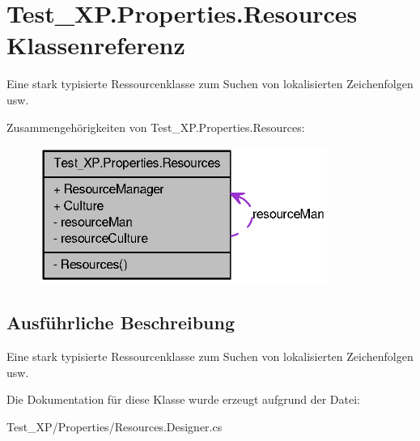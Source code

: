 \hypertarget{class_test___x_p_1_1_properties_1_1_resources}{
\section{Test\_\-XP.Properties.Resources Klassenreferenz}
\label{class_test___x_p_1_1_properties_1_1_resources}
}


Eine stark typisierte Ressourcenklasse zum Suchen von lokalisierten Zeichenfolgen usw.  




Zusammengehörigkeiten von Test\_\-XP.Properties.Resources:\nopagebreak
\begin{figure}[H]
\begin{center}
\leavevmode
\includegraphics[width=267pt]{class_test___x_p_1_1_properties_1_1_resources__coll__graph}
\end{center}
\end{figure}


\subsection{Ausführliche Beschreibung}
Eine stark typisierte Ressourcenklasse zum Suchen von lokalisierten Zeichenfolgen usw. 

Die Dokumentation für diese Klasse wurde erzeugt aufgrund der Datei:\begin{DoxyCompactItemize}
\item 
Test\_\-XP/Properties/Resources.Designer.cs\end{DoxyCompactItemize}
